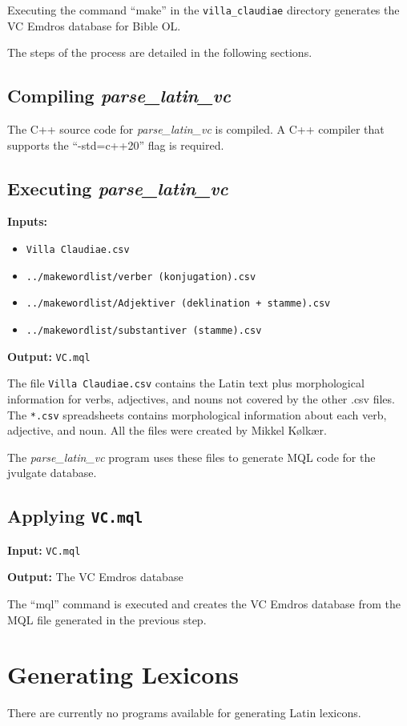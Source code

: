 \documentclass[11pt,oneside,a4paper,article]{memoir}
\begin{document}
Executing the command ``make'' in the \texttt{villa\_claudiae} directory generates the VC Emdros
database for Bible OL.

The steps of the process are detailed in the following sections.


\section{Compiling \emph{parse\_latin\_vc}}

The C++ source code for \emph{parse\_latin\_vc} is compiled. A C++ compiler that supports the
``-std=c++20'' flag is required.


\section{Executing \emph{parse\_latin\_vc}}

\noindent \textbf{Inputs:}

\begin{itemize}
\item \texttt{Villa Claudiae.csv}
\item \texttt{../makewordlist/verber (konjugation).csv}
\item \texttt{../makewordlist/Adjektiver (deklination + stamme).csv}
\item \texttt{../makewordlist/substantiver (stamme).csv}
\end{itemize}

\noindent \textbf{Output:} \texttt{VC.mql}

\vspace{1ex}

\noindent
The file \texttt{Villa Claudiae.csv} contains the Latin text plus morphological information for
verbs, adjectives, and nouns not covered by the other .csv files. The
\texttt{*.csv} spreadsheets contains morphological information about each verb, adjective, and noun.
All the files were created by Mikkel Kølkær.

The \emph{parse\_latin\_vc} program uses these files to generate MQL code for the jvulgate database.

\section{Applying \texttt{VC.mql}}

\noindent \textbf{Input:} \texttt{VC.mql}

\noindent \textbf{Output:} The VC Emdros database

\vspace{1ex}

\noindent
The ``mql'' command is executed and creates the VC Emdros database from the MQL file generated in
the previous step.






\chapter{Generating Lexicons}

There are currently no programs available for generating Latin lexicons.
\end{document}
